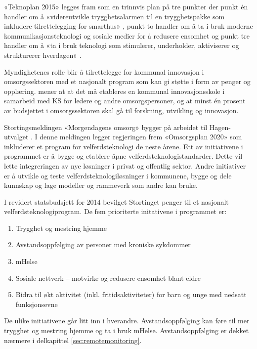 «Teknoplan 2015» legges fram som en trinnvis plan på tre punkter der punkt én handler om å «videreutvikle trygghetsalarmen
til en trygghetspakke som inkludere tilrettelegging for smarthus» , punkt to handler om å ta i bruk moderne
kommunikasjonsteknologi og sosiale medier for å redusere ensomhet og punkt tre handler om å «ta i bruk teknologi
som stimulerer, underholder, aktiviserer og strukturerer hverdagen» \citep[s. 17]{regjeringen_hagen}.

Myndighetenes rolle blir å tilrettelegge for kommunal innovasjon i omsorgssektoren med et nasjonalt program
som kan gi støtte i form av penger og opplæring. \citet[s. 19]{regjeringen_hagen} mener at at det må
etableres en kommunal innovasjonsskole i samarbeid med KS for ledere og andre omsorgspersoner, og at minst én prosent
av budsjettet i omsorgssektoren skal gå til forskning, utvikling og innovasjon.

Stortingsmeldingen «Morgendagens omsorg» bygger på arbeidet til Hagen-utvalget \citep{morgendagens_omsorg}.
I denne meldingen legger regjeringen frem «Omsorgsplan 2020» som inkluderer et program for velferdsteknologi de neste årene.
Ett av initiativene i programmet er å bygge og etablere åpne velferdsteknologistandarder. Dette vil lette integreringen av nye
løsninger i privat og offentlig sektor. Andre initiativer er å utvikle og teste velferdsteknologiløsninger i kommunene,
bygge og dele kunnskap og lage modeller og rammeverk som andre kan bruke.

I revidert statsbudsjett for 2014 bevilget Stortinget penger til et nasjonalt velferdsteknologiprogram. De fem prioriterte
initativene i programmet er:

\begin{enumerate}
    \item Trygghet og mestring hjemme
    \item Avstandsoppfølging av personer med kroniske sykdommer
    \item mHelse
    \item Sosiale nettverk -- motvirke og redusere ensomhet blant eldre
    \item Bidra til økt aktivitet (inkl. fritidsaktiviteter) for barn og unge med nedsatt funksjonsevne
\end{enumerate}

De ulike initiativene går litt inn i hverandre. Avstandsoppfølging kan føre til mer trygghet og mestring hjemme
og ta i bruk mHelse. Avstandsoppfølging er dekket nærmere i delkapittel \ref{sec:remotemonitoring}.

